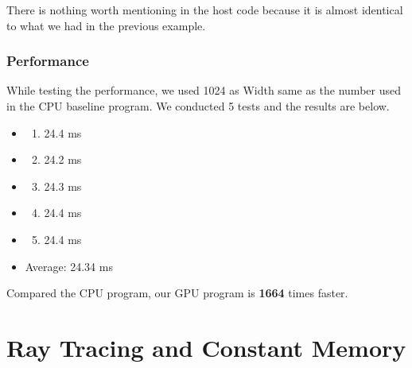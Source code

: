 \documentclass[letterpaper,10pt,openany,oneside]{sphinxmanual}
\begin{document}
There is nothing worth mentioning in the host code because it is almost identical to what we had in the previous example.


\subsection{Performance}
\label{CUDA2D/CUDA2D:id4}
While testing the performance, we used 1024 as Width same as the number used in the CPU baseline program. We conducted 5 tests and the results are below.
\begin{itemize}
\item {} \begin{enumerate}
\item {} 
24.4 ms

\end{enumerate}

\item {} \begin{enumerate}
\setcounter{enumi}{1}
\item {} 
24.2 ms

\end{enumerate}

\item {} \begin{enumerate}
\setcounter{enumi}{2}
\item {} 
24.3 ms

\end{enumerate}

\item {} \begin{enumerate}
\setcounter{enumi}{3}
\item {} 
24.4 ms

\end{enumerate}

\item {} \begin{enumerate}
\setcounter{enumi}{4}
\item {} 
24.4 ms

\end{enumerate}

\item {} 
Average: 24.34 ms

\end{itemize}

Compared the CPU program, our GPU program is \textbf{1664} times faster.


\chapter{Ray Tracing and Constant Memory}
\label{RTACM/RTACM::doc}\label{RTACM/RTACM:ray-tracing-and-constant-memory}
\end{document}
